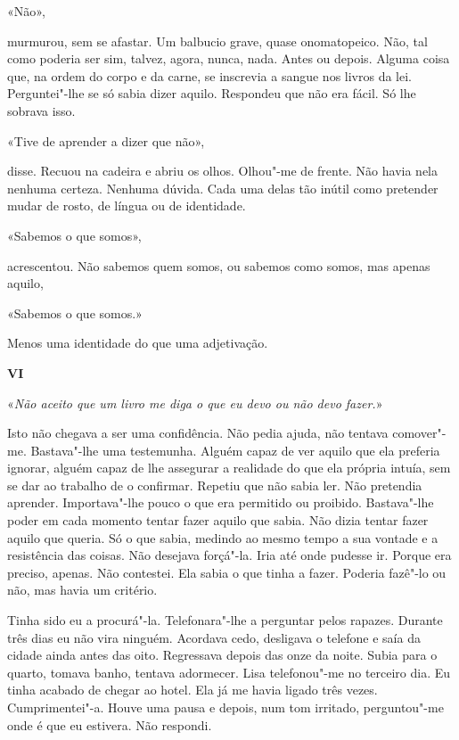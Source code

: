 «Não»,

murmurou, sem se afastar. Um balbucio grave, quase onomatopeico. Não,
tal como poderia ser sim, talvez, agora, nunca, nada. Antes ou depois.
Alguma coisa que, na ordem do corpo e da carne, se inscrevia a sangue
nos livros da lei. Perguntei"-lhe se só sabia dizer aquilo. Respondeu
que não era fácil. Só lhe sobrava isso.

«Tive de aprender a dizer que não»,

disse. Recuou na cadeira e abriu os olhos. Olhou"-me de frente. Não
havia nela nenhuma certeza. Nenhuma dúvida. Cada uma delas tão inútil
como pretender mudar de rosto, de língua ou de identidade.

«Sabemos o que somos»,

acrescentou. Não sabemos quem somos, ou sabemos como somos, mas apenas
aquilo,

«Sabemos o que somos.»

Menos uma identidade do que uma adjetivação.

\vspace*{1.8cm}
\noindent{}\textbf{VI}

\bigskip

«\emph{Não aceito que um livro me diga o que eu devo ou não devo
fazer.}»

Isto não chegava a ser uma confidência. Não pedia ajuda, não tentava
comover"-me. Bastava"-lhe uma testemunha. Alguém capaz de ver aquilo que
ela preferia ignorar, alguém capaz de lhe assegurar a realidade do que
ela própria intuía, sem se dar ao trabalho de o confirmar. Repetiu que
não sabia ler. Não pretendia aprender. Importava"-lhe pouco o que era
permitido ou proibido. Bastava"-lhe poder em cada momento tentar fazer
aquilo que sabia. Não dizia tentar fazer aquilo que queria. Só o que
sabia, medindo ao mesmo tempo a sua vontade e a resistência das coisas.
Não desejava forçá"-la. Iria até onde pudesse ir. Porque era preciso,
apenas. Não contestei. Ela sabia o que tinha a fazer. Poderia fazê"-lo
ou não, mas havia um critério.

Tinha sido eu a procurá"-la. Telefonara"-lhe a perguntar pelos rapazes.
Durante três dias eu não vira ninguém. Acordava cedo, desligava o
telefone e saía da cidade ainda antes das oito. Regressava depois das
onze da noite. Subia para o quarto, tomava banho, tentava adormecer.
Lisa telefonou"-me no terceiro dia. Eu tinha acabado de chegar ao hotel.
Ela já me havia ligado três vezes. Cumprimentei"-a. Houve uma pausa e
depois, num tom irritado, perguntou"-me onde é que eu estivera. Não
respondi.


